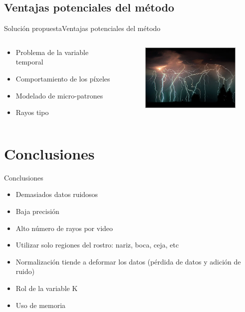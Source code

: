 \documentclass{beamer}
\begin{document}
	\subsection{Ventajas potenciales del método}
		\begin{frame}{Solución propuesta}{Ventajas potenciales del método}
			\begin{columns}[onlytextwidth]
   	 			\begin{column}{0.5\textwidth}			
					\begin{itemize}
						\item Problema de la variable temporal
						\item Comportamiento de los píxeles				
						\item Modelado de micro-patrones				
						\item Rayos tipo			
					\end{itemize}
				\end{column}
				\begin{column}{0.5\textwidth}			
					\begin{figure}[bt]
        					\centering
                			\includegraphics[width=5cm]{imagenes/fotos-de-rayos.jpg}
            			\end{figure}
				\end{column}

			\end{columns}
		\end{frame}	
			        
  \section{Conclusiones}
	\begin{frame}{Conclusiones}
		\begin{itemize}
			\item Demasiados datos ruidosos
			\item Baja precisión
			\item Alto número de rayos por video
			\item Utilizar solo regiones del rostro: nariz, boca, ceja, etc
			\item Normalización tiende a deformar los datos (pérdida de datos y adición de ruido)
			\item Rol de la variable K
			\item Uso de memoria
		\end{itemize}
	\end{frame}      
\end{document}
